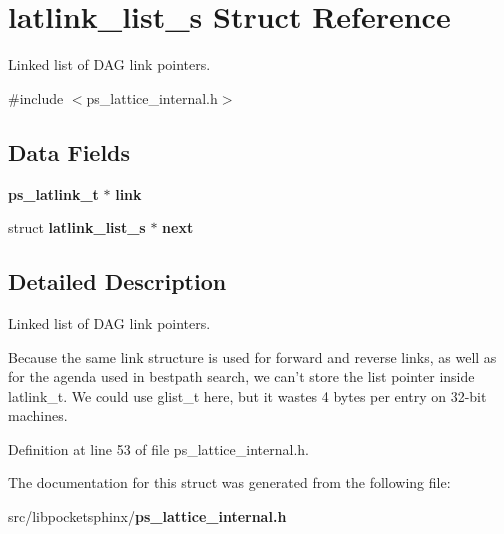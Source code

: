 \section{latlink\-\_\-list\-\_\-s \-Struct \-Reference}
\label{structlatlink__list__s}


\-Linked list of \-D\-A\-G link pointers.  




{\ttfamily \#include $<$ps\-\_\-lattice\-\_\-internal.\-h$>$}

\subsection*{\-Data \-Fields}
\begin{DoxyCompactItemize}
\item 
{\bf ps\-\_\-latlink\-\_\-t} $\ast$ {\bfseries link}\label{structlatlink__list__s_accd8f5fdb23871b66b81c830e3808068}

\item 
struct {\bf latlink\-\_\-list\-\_\-s} $\ast$ {\bfseries next}\label{structlatlink__list__s_a17b319bb0f536542267496afecc8de10}

\end{DoxyCompactItemize}


\subsection{\-Detailed \-Description}
\-Linked list of \-D\-A\-G link pointers. 

\-Because the same link structure is used for forward and reverse links, as well as for the agenda used in bestpath search, we can't store the list pointer inside latlink\-\_\-t. \-We could use glist\-\_\-t here, but it wastes 4 bytes per entry on 32-\/bit machines. 

\-Definition at line 53 of file ps\-\_\-lattice\-\_\-internal.\-h.



\-The documentation for this struct was generated from the following file\-:\begin{DoxyCompactItemize}
\item 
src/libpocketsphinx/{\bf ps\-\_\-lattice\-\_\-internal.\-h}\end{DoxyCompactItemize}
